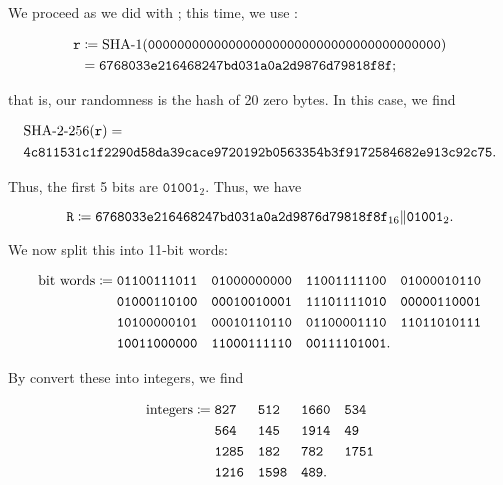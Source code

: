 \begin{example}

We proceed as we did with \MDFive{};
this time, we use \ShaOne{}:

\begin{align}
    \texttt{r} &\mathDef{} \text{\ShaOne{}}(
        \texttt{0000000000000000000000000000000000000000})
        \nonumber\\
    &= \texttt{6768033e216468247bd031a0a2d9876d79818f8f};
\end{align}

\noindent
that is, our randomness is the \ShaOne{} hash of 20 zero bytes.
In this case, we find

\begin{align}
    &\text{\ShaTwo{}-256}(\texttt{r}) = \nonumber\\
    &\texttt{4c811531c1f2290d58da39cace9720192b0563354b3f9172584682e913c92c75}.
\end{align}

\noindent
Thus, the first 5 bits are $\texttt{01001}_{2}$.
Thus, we have

\begin{equation}
    \texttt{R} \coloneqq{} \texttt{6768033e216468247bd031a0a2d9876d79818f8f}_{16}
    \|\texttt{01001}_{2}.
\end{equation}

We now split this into 11-bit words:

\begin{align}
    \text{bit words} \coloneqq{}
    &\texttt{01100111011}\quad
    \texttt{01000000000}\quad
    \texttt{11001111100}\quad
    \texttt{01000010110} \nonumber\\
    &\texttt{01000110100}\quad
    \texttt{00010010001}\quad
    \texttt{11101111010}\quad
    \texttt{00000110001} \nonumber\\
    &\texttt{10100000101}\quad
    \texttt{00010110110}\quad
    \texttt{01100001110}\quad
    \texttt{11011010111} \nonumber\\
    &\texttt{10011000000}\quad
    \texttt{11000111110}\quad
    \texttt{00111101001}.
\end{align}

\noindent
By convert these into integers, we find

\begin{align}
    \text{integers} \coloneqq{}
    &\texttt{827 }\quad
    \texttt{512 }\quad
    \texttt{1660}\quad
    \texttt{534 } \nonumber\\
    &\texttt{564 }\quad
    \texttt{145 }\quad
    \texttt{1914}\quad
    \texttt{49  } \nonumber\\
    &\texttt{1285}\quad
    \texttt{182 }\quad
    \texttt{782 }\quad
    \texttt{1751} \nonumber\\
    &\texttt{1216}\quad
    \texttt{1598}\quad
    \texttt{489}.
\end{align}


\end{example}
